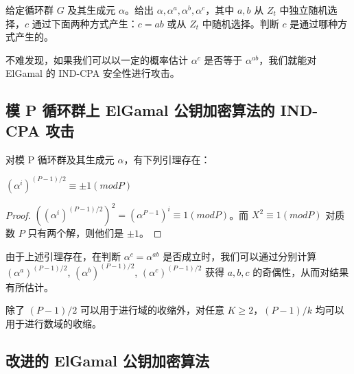 \begin{theorem}
	给定循环群 $G$ 及其生成元 $\alpha$。给出 $\alpha, \alpha^a, \alpha^b, \alpha^c$，其中 $a, b$ 从 $Z_t$ 中独立随机选择，$c$ 通过下面两种方式产生：$c = ab$ 或从 $Z_t$ 中随机选择。判断 $c$ 是通过哪种方式产生的。
\end{theorem}

不难发现，如果我们可以以一定的概率估计 $\alpha^c$ 是否等于 $\alpha^{ab}$，我们就能对 ElGamal 的 IND-CPA 安全性进行攻击。

\subsection{模 P 循环群上 ElGamal 公钥加密算法的 IND-CPA 攻击}

对模 P 循环群及其生成元 $\alpha$，有下列引理存在：

\begin{lemma}
	$(\alpha^i)^{(P-1)/2} \equiv \pm 1 (mod P)$
\end{lemma}

\begin{proof}
	$((\alpha^i)^{(P-1)/2})^2 = (\alpha^{P-1})^i \equiv 1 (mod P)$。而 $X^2 \equiv 1 (mod P)$ 对质数 $P$ 只有两个解，则他们是 $\pm 1$。
\end{proof}

由于上述引理存在，在判断 $\alpha^c = \alpha^{ab}$ 是否成立时，我们可以通过分别计算 $(\alpha^a)^{(P-1)/2}$, $(\alpha^b)^{(P-1)/2}$, $(\alpha^c)^{(P-1)/2}$ 获得 $a, b, c$ 的奇偶性，从而对结果有所估计。

除了 $(P-1)/2$ 可以用于进行域的收缩外，对任意 $K \ge 2$，$(P-1)/k$ 均可以用于进行数域的收缩。

\subsection{改进的 ElGamal 公钥加密算法}
